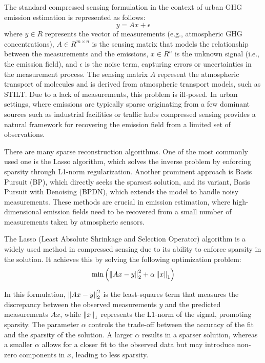 The standard compressed sensing formulation in the context of urban GHG emission estimation is represented as follows:
\begin{equation}
    y = A x + \epsilon
\end{equation}
where $y \in R$ represents the vector of measurements (e.g., atmospheric GHG concentrations), $A \in R^{m \times n}$ is the sensing matrix that models the relationship between the measurements and the emissions, $x \in R^n$ is the unknown signal (i.e., the emission field), and $\epsilon$ is the noise term, capturing errors or uncertainties in the measurement process.
The sensing matrix $A$ represent the atmospheric transport of molecules and is derived from atmospheric transport models, such as STILT.
Due to a lack of measurements, this problem is ill-posed.
In urban settings, where emissions are typically sparse originating from a few dominant sources such as industrial facilities or traffic hubs compressed sensing provides a natural framework for recovering the emission field from a limited set of observations.

There are many sparse reconstruction algorithms.
One of the most commonly used one is the Lasso algorithm, which solves the inverse problem by enforcing sparsity through L1-norm regularization.
Another prominent approach is Basis Pursuit (BP), which directly seeks the sparsest solution, and its variant, Basis Pursuit with Denoising (BPDN), which extends the model to handle noisy measurements.
These methods are crucial in emission estimation, where high-dimensional emission fields need to be recovered from a small number of measurements taken by atmospheric sensors.

The Lasso (Least Absolute Shrinkage and Selection Operator) algorithm is a widely used method in compressed sensing due to its ability to enforce sparsity in the solution.
It achieves this by solving the following optimization problem:
\begin{equation}
    \min{\left( \left\lVert Ax -y \right\rVert_2^2 + \alpha\left\lVert x\right\rVert_1 \right)}
\end{equation}

In this formulation, $\left\lVert Ax -y \right\rVert_2^2$ is the least-squares term that measures the discrepancy between the observed measurements $y$ and the predicted measurements $Ax$, while $\left\lVert x\right\rVert_1$ represents the L1-norm of the signal, promoting sparsity.
The parameter $\alpha$ controls the trade-off between the accuracy of the fit and the sparsity of the solution.
A larger $\alpha$ results in a sparser solution, whereas a smaller $\alpha$ allows for a closer fit to the observed data but may introduce non-zero components in $x$, leading to less sparsity.

